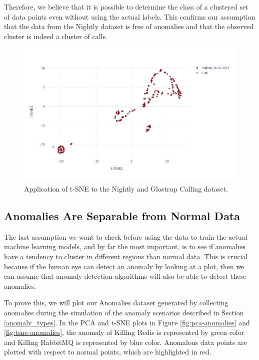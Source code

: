 Therefore, we believe that it is possible to determine the class of a clustered set of data points even without using the actual labels. This confirms our assumption that the data from the Nightly dataset is free of anomalies and that the observed cluster is indeed a cluster of calls.

\begin{figure}[h]
    \centering
    \includegraphics[width=\textwidth]{img/tsne-nights-call-comparison.pdf}
    \caption{Application of t-SNE to the Nightly and Glostrup Calling dataset.}
    \label{fig:tsne-nightly-calls}
\end{figure}

\subsection{Anomalies Are Separable from Normal Data}
\label{assumption-anomalies}
The last assumption we want to check before using the data to train the actual machine learning models, and by far the most important, is to see if anomalies have a tendency to cluster in different regions than normal data. This is crucial because if the human eye can detect an anomaly by looking at a plot, then we can assume that anomaly detection algorithms will also be able to detect these anomalies. 

To prove this, we will plot our Anomalies dataset generated by collecting anomalies during the simulation of the anomaly scenarios described in Section \ref{anomaly_types}. In the PCA and t-SNE plots in Figure \ref{fig:pca-anomalies} and \ref{fig:tsne-anomalies}, the anomaly of Killing Redis is represented by green color and Killing RabbitMQ is represented by blue color. Anomalous data points are plotted with respect to normal points, which are highlighted in red. 

